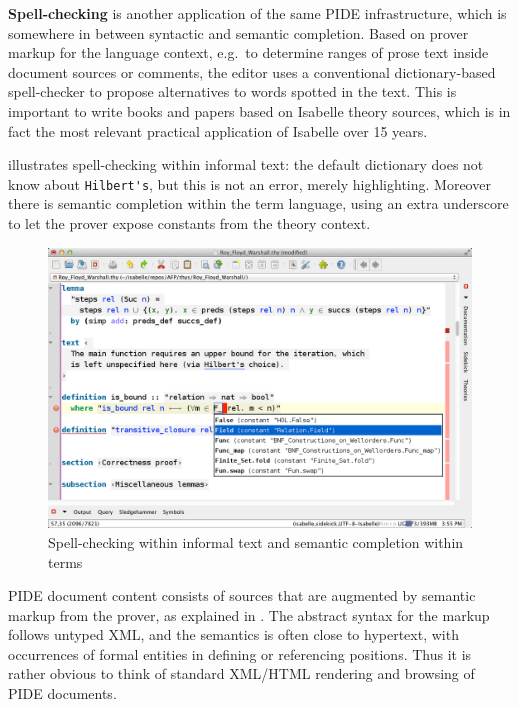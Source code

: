 \begin{isabellebody}
\begin{isamarkuptext}
\begin{itemize}
\begin{itemize}
\end{itemize}

\end{itemize}

\textbf{Spell-checking} is another application of the same PIDE
infrastructure, which is somewhere in between syntactic and semantic
completion. Based on prover markup for the language context, e.g.\ to
determine ranges of prose text inside document sources or comments, the
editor uses a conventional dictionary-based spell-checker to propose
alternatives to words spotted in the text. This is important to write books
and papers based on Isabelle theory sources, which is in fact the most
relevant practical application of Isabelle over 15 years.

 illustrates spell-checking within informal text: the
default dictionary does not know about \verb,Hilbert's,, but this is not an
error, merely highlighting. Moreover there is semantic completion within the
term language, using an extra underscore to let the prover expose
constants from the theory context.

\begin{figure}[htb]
\begin{center}
\includegraphics[scale=0.333]{completion}
\end{center}
\caption{Spell-checking within informal text and semantic completion
  within terms}
\label{fig:completion}
\end{figure}%
\end{isamarkuptext}%
\isamarkuptrue%
%
\isamarkuptrue%
%
\begin{isamarkuptext}%
PIDE document content consists of sources that are augmented by
semantic markup from the prover, as explained in \cite{Wenzel:2011:CICM}.
The abstract syntax for the markup follows untyped XML, and the semantics is
often close to hypertext, with occurrences of formal entities in defining or
referencing positions. Thus it is rather obvious to think of standard
XML/HTML rendering and browsing of PIDE documents.


\end{isamarkuptext}
\end{isabellebody}
